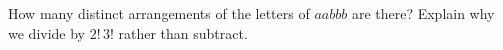 How many distinct arrangements of the letters of $aabbb$ are there? Explain why we divide by $2!\,3!$ rather than subtract.
